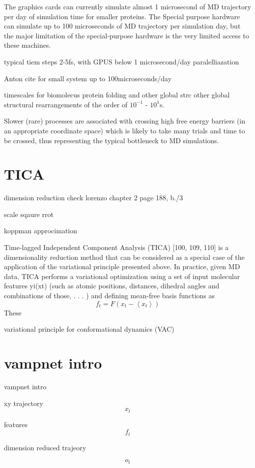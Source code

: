The graphics cards can currently simulate almost 1 microsecond of MD trajectory per day of simulation time for smaller proteins. The Special purpose hardware can simulate up to 100 microseconds of MD trajectory per simulation day, but the major limitation of the special-purpose hardware is the very limited access to these machines. 




typical tiem steps 2-5fs, with GPUS below 1 microsecond/day paralelliazation

Anton cite for small system up to 100microseconds/day

timescales  
for biomolecus protein folding and other global strc
other global structural rearrangements of the order of
$10^{-1}$ - $10^{1}$s.

Slower (rare) processes are associated with crossing high free energy barriers
(in an appropriate coordinate space) which is likely to take many trials and time to be
crossed, thus representing the typical bottleneck to MD simulations.

\section{TICA}
dimension reduction
check  lorenzo chapter 2
page 188, b./3

scale sqaure rrot

koppman approcimation


Time-lagged Independent Component Analysis (TICA) [100, 109, 110] is a dimensionality
reduction method that can be considered as a special case of the application of the
variational principle presented above. In practice, given MD data, TICA performs a variational
optimization using a set of input molecular features yi(xt) (such as atomic positions,
distances, dihedral angles and combinations of those, . . . ) and defining mean-free basis
functions as
$$f_{t}=F\left(x_{t}-\left\langle x_{t}\right\rangle \right)$$
These

variational principle for conformational dynamics (VAC)


\section{vampnet intro}
vampnet intro


xy trajectory
$$x_{t}$$

features
$$f_{t}$$

dimension reduced trajeory

$$o_{t}$$

